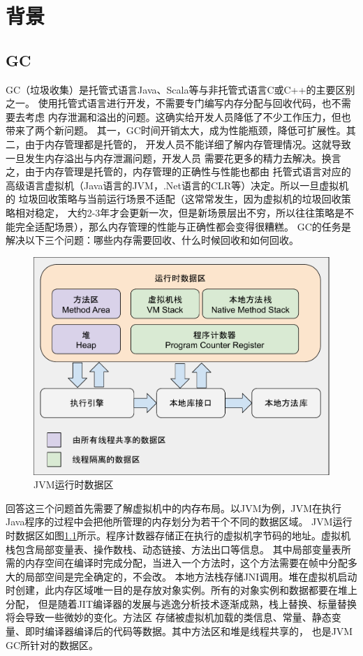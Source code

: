 \chapter{背景}

\section{GC}
GC（垃圾收集）是托管式语言Java、Scala等与非托管式语言C或C++的主要区别之一。
使用托管式语言进行开发，不需要专门编写内存分配与回收代码，也不需要去考虑
内存泄漏和溢出的问题。这确实给开发人员降低了不少工作压力，但也带来了两个新问题。
其一，GC时间开销太大，成为性能瓶颈，降低可扩展性。其二，由于内存管理都是托管的，
开发人员不能详细了解内存管理情况。这就导致一旦发生内存溢出与内存泄漏问题，开发人员
需要花更多的精力去解决。换言之，由于内存管理是托管的，内存管理的正确性与性能也都由
托管式语言对应的高级语言虚拟机（Java语言的JVM，.Net语言的CLR等）决定。所以一旦虚拟机的
垃圾回收策略与当前运行场景不适配（这常常发生，因为虚拟机的垃圾回收策略相对稳定，
大约2-3年才会更新一次，但是新场景层出不穷，所以往往策略是不能完全适配场景），那么内存管理的性能与正确性都会变得很糟糕。
GC的任务是解决以下三个问题：哪些内存需要回收、什么时候回收和如何回收。

\begin{figure}[h]
    \centering
    \includegraphics[width=12cm]{figure/JVM_memory_layout.pdf}
    \caption{JVM运行时数据区\cite{Understand_JVM}}
    \label{jvm_memory_layout}
\end{figure}

回答这三个问题首先需要了解虚拟机中的内存布局。以JVM为例，JVM在执行Java程序的过程中会把他所管理的内存划分为若干个不同的数据区域。
JVM运行时数据区如图\ref{jvm_memory_layout}所示。程序计数器存储正在执行的虚拟机字节码的地址。虚拟机栈包含局部变量表、操作数栈、动态链接、方法出口等信息。
其中局部变量表所需的内存空间在编译时完成分配，当进入一个方法时，这个方法需要在帧中分配多大的局部空间是完全确定的，不会改。
本地方法栈存储JNI调用。堆在虚拟机启动时创建，此内存区域唯一目的是存放对象实例。所有的对象实例和数据都要在堆上分配，
但是随着JIT编译器的发展与逃逸分析技术逐渐成熟，栈上替换、标量替换将会导致一些微妙的变化。方法区
存储被虚拟机加载的类信息、常量、静态变量、即时编译器编译后的代码等数据。其中方法区和堆是线程共享的，
也是JVM GC所针对的数据区。

